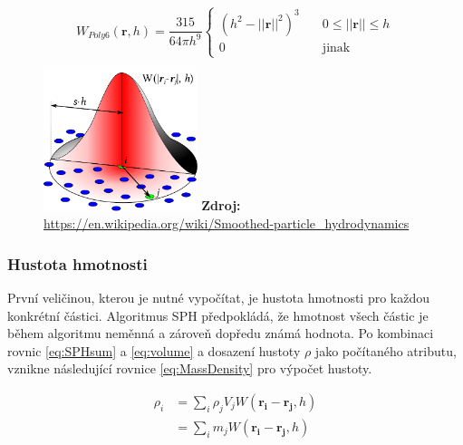 \begin{equation}
	W_{Poly6}(\mathbf{r},h) = \frac{315}{64 \pi h^9}
	\begin{cases}
		(h^2 - ||\mathbf{r}||^2)^3 & \quad 0 \leq ||\mathbf{r}|| \leq h \\
		0                          & \quad \text{jinak}
	\end{cases}
	\label{eq:kernelPoly6}
\end{equation}

\begin{figure}[hbt]
	\centering
	\captionsetup{justification=centering}
	\includegraphics[width=0.4\textwidth]{obrazky-figures/SPHInterpolationColorsVerbose.png}
	\textbf{Zdroj: } \url{https://en.wikipedia.org/wiki/Smoothed-particle_hydrodynamics}
	\label{fig:Kernel}
\end{figure}

\newpage

\subsubsection{Hustota hmotnosti}
První veličinou, kterou je nutné vypočítat, je hustota hmotnosti pro každou konkrétní částici. Algoritmus SPH předpokládá, že hmotnost všech částic je během algoritmu neměnná a zároveň dopředu známá hodnota. Po kombinaci rovnic \ref{eq:SPHsum} a \ref{eq:volume} a dosazení hustoty $\rho$ jako počítaného atributu, vznikne následující rovnice \ref{eq:MassDensity} pro výpočet hustoty.


\begin{equation}
	\begin{split}
		\rho_i  & = \sum_i \rho_j V_j W(\mathbf{r_i} - \mathbf{r_j},h) \\
		& = \sum_i m_j W(\mathbf{r_i} - \mathbf{r_j},h)
	\end{split}
	\label{eq:MassDensity}
\end{equation}

